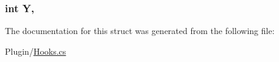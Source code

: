 \subsubsection[{Y}]{\setlength{\rightskip}{0pt plus 5cm}int Y\hspace{0.3cm}{\ttfamily [get]}, {\ttfamily [set]}}\label{structOTA_1_1Plugin_1_1HookArgs_1_1LiquidFlowReceived_aa482c4cc86a24474e4fb19b5b5978778}


The documentation for this struct was generated from the following file\+:\begin{DoxyCompactItemize}
\item 
Plugin/\hyperlink{Hooks_8cs}{Hooks.\+cs}\end{DoxyCompactItemize}
